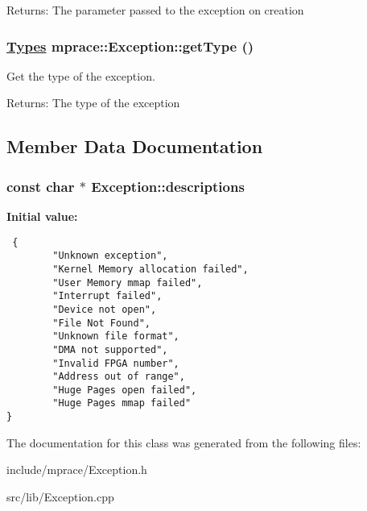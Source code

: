 \begin{Desc}
\item[Returns:]The parameter passed to the exception on creation\end{Desc}
\hypertarget{classmprace_1_1Exception_a2}{
\subsubsection[getType]{\setlength{\rightskip}{0pt plus 5cm}\hyperlink{classmprace_1_1Exception_w12}{Types} mprace::Exception::get\-Type ()}}
\label{classmprace_1_1Exception_a2}


Get the type of the exception. 

\begin{Desc}
\item[Returns:]The type of the exception\end{Desc}


\subsection{Member Data Documentation}
\hypertarget{classmprace_1_1Exception_s0}{
\subsubsection[descriptions]{\setlength{\rightskip}{0pt plus 5cm}const char $\ast$ Exception::descriptions}}
\label{classmprace_1_1Exception_s0}


{\bf Initial value:}

\footnotesize\begin{verbatim} {
        "Unknown exception",
        "Kernel Memory allocation failed",
        "User Memory mmap failed",
        "Interrupt failed",
        "Device not open",
        "File Not Found",
        "Unknown file format",
        "DMA not supported",
        "Invalid FPGA number",
        "Address out of range",
        "Huge Pages open failed",
        "Huge Pages mmap failed"
}
\end{verbatim}\normalsize 


The documentation for this class was generated from the following files:\begin{CompactItemize}
\item 
include/mprace/Exception.h\item 
src/lib/Exception.cpp\end{CompactItemize}
